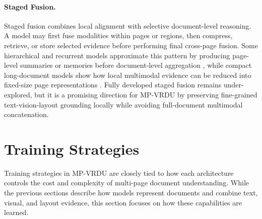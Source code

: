 \documentclass[11pt]{article}
\begin{document}

\paragraph{Staged Fusion.}
Staged fusion combines local alignment with selective document-level reasoning. A model may first fuse modalities within pages or regions, then compress, retrieve, or store selected evidence before performing final cross-page fusion. Some hierarchical and recurrent models approximate this pattern by producing page-level summaries or memories before document-level aggregation \cite{tito2023hierarchical, dong2024multi}, while compact long-document models show how local multimodal evidence can be reduced into fixed-size page representations \cite{hannan2025docslm}. Fully developed staged fusion remains under-explored, but it is a promising direction for MP-VRDU by preserving fine-grained text-vision-layout grounding locally while avoiding full-document multimodal concatenation.

\section{Training Strategies}
Training strategies in MP-VRDU are closely tied to how each architecture controls the cost and complexity of multi-page document understanding. While the previous sections describe how models represent documents and combine text, visual, and layout evidence, this section focuses on how these capabilities are learned.
\end{document}
